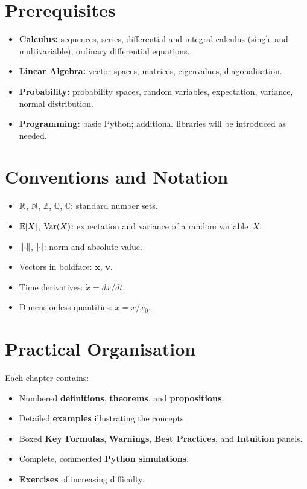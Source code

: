 \section*{Prerequisites}

\begin{itemize}
  \item \textbf{Calculus:} sequences, series, differential and integral
        calculus (single and multivariable), ordinary differential equations.
  \item \textbf{Linear Algebra:} vector spaces, matrices, eigenvalues,
        diagonalisation.
  \item \textbf{Probability:} probability spaces, random variables,
        expectation, variance, normal distribution.
  \item \textbf{Programming:} basic Python; additional libraries will be
        introduced as needed.
\end{itemize}

\section*{Conventions and Notation}

\begin{itemize}
  \item $\mathbb{R}$, $\mathbb{N}$, $\mathbb{Z}$, $\mathbb{Q}$, $\mathbb{C}$: standard
        number sets.
  \item $\mathbb{E}[X]$, $\mathrm{Var}(X)$: expectation and variance of a random
        variable~$X$.
  \item $\left\| \cdot \right\|$, $\left| \cdot \right|$: norm and absolute value.
  \item Vectors in boldface: $\mathbf{x}$, $\mathbf{v}$.
  \item Time derivatives: $\dot{x} = dx/dt$.
  \item Dimensionless quantities: $\tilde{x} = x/x_0$.
\end{itemize}

\section*{Practical Organisation}

Each chapter contains:
\begin{itemize}
  \item Numbered \textbf{definitions}, \textbf{theorems}, and
        \textbf{propositions}.
  \item Detailed \textbf{examples} illustrating the concepts.
  \item Boxed \textbf{Key Formulas}, \textbf{Warnings},
        \textbf{Best Practices}, and \textbf{Intuition} panels.
  \item Complete, commented \textbf{Python simulations}.
  \item \textbf{Exercises} of increasing difficulty.
\end{itemize}

